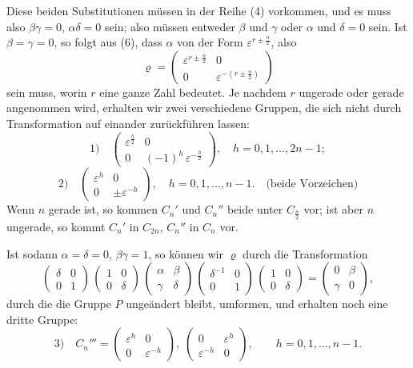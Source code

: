 \documentclass[12pt,a4paper]{article}
\begin{document}
Diese beiden Substitutionen müssen in der Reihe (4) vorkommen, und es muss also $\beta\gamma = 0$, $\alpha\delta = 0$ sein; also müssen entweder $\beta$ und $\gamma$ oder $\alpha$ und $\delta = 0$ sein. Ist $\beta = \gamma = 0$, so folgt aus (6), dass $\alpha$ von der Form $\varepsilon^{r\pm\frac{n}{2}}$, also
\[
\varrho = \begin{pmatrix}\varepsilon^{r\pm\frac{n}{2}}&0\\0&\varepsilon^{-(r\pm\frac{n}{2})}\end{pmatrix}
\]
sein muss, worin $r$ eine ganze Zahl bedeutet. Je nachdem $r$ ungerade oder gerade angenommen wird, erhalten wir zwei verschiedene Gruppen, die sich nicht durch Transformation auf einander zurückführen lassen:
\[
\text{1)}\quad
\begin{pmatrix}\varepsilon^{\frac{h}{2}}&0\\0&(-1)^{h}\,\varepsilon^{-\frac{h}{2}}\end{pmatrix},\quad
h = 0,1,\ldots,2n-1;
\]
\[
\text{2)}\quad
\begin{pmatrix}\varepsilon^{h}&0\\0&\pm\varepsilon^{-h}\end{pmatrix},\quad
h = 0,1,\ldots,n-1.\quad \text{(beide Vorzeichen)}
\]
Wenn $n$ gerade ist, so kommen $C_{n}'$ und $C_{n}''$ beide unter $C_{\frac{n}{2}}$ vor; ist aber $n$ ungerade, so kommt $C_{n}'$ in $C_{2n}$, $C_{n}''$ in $C_{n}$ vor.

Ist sodann $\alpha = \delta = 0$, $\beta\gamma = 1$, so können wir $\varrho$ durch die Transformation
\[
\begin{pmatrix}\delta&0\\0&1\end{pmatrix}\,
\begin{pmatrix}1&0\\0&\delta\end{pmatrix}\,
\begin{pmatrix}\alpha&\beta\\\gamma&\delta\end{pmatrix}\,
\begin{pmatrix}\delta^{-1}&0\\0&1\end{pmatrix}\,
\begin{pmatrix}1&0\\0&\delta\end{pmatrix}
= \begin{pmatrix}0&\beta\\\gamma&0\end{pmatrix},
\]
durch die die Gruppe $P$ ungeändert bleibt, umformen, und erhalten noch eine dritte Gruppe:
\[
\text{3)}\quad
C_{n}''' =
\begin{pmatrix}\varepsilon^{h}&0\\0&\varepsilon^{-h}\end{pmatrix},\;
\begin{pmatrix}0&\varepsilon^{h}\\\varepsilon^{-h}&0\end{pmatrix},\qquad
h = 0,1,\ldots,n-1.
\]
\end{document}
